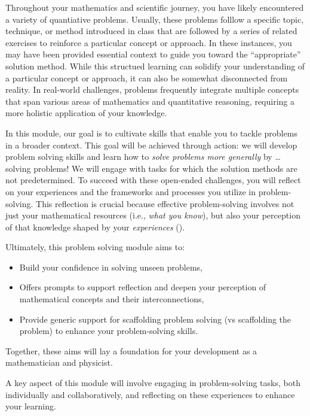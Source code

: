 \documentclass[
  a4paper,
  DIV=11,
  numbers=noendperiod,
  oneside]{scrreprt}
\providecommand{\tightlist}{%
  \setlength{\itemsep}{0pt}\setlength{\parskip}{0pt}}
\begin{document}
Throughout your mathematics and scientific journey, you have likely
encountered a variety of quantiative problems. Usually, these problems
folllow a specific topic, technique, or method introduced in class that
are followed by a series of related exercises to reinforce a particular
concept or approach. In these instances, you may have been provided
essential context to guide you toward the ``appropriate'' solution
method. While this structued learning can solidify your understanding of
a particular concept or approach, it can also be somewhat disconnected
from reality. In real-world challenges, problems frequently integrate
multiple concepts that span various areas of mathematics and
quantitative reasoning, requiring a more holistic application of your
knowledge.

In this module, our goal is to cultivate skills that enable you to
tackle problems in a broader context. This goal will be achieved through
action: we will develop problem solving skills and learn how to
\emph{solve problems more generally} by \ldots{} solving problems! We
will engage with tasks for which the solution methods are not
predetermined. To succeed with these open-ended challenges, you will
reflect on your experiences and the frameworks and processes you utilize
in problem-solving. This reflection is crucial because effective
problem-solving involves not just your mathematical resources (i.e.,
\emph{what you know}), but also your perception of that knowledge shaped
by your \emph{experiences} ().

Ultimately, this problem solving module aims to:

\begin{itemize}
\tightlist
\item
  Build your confidence in solving unseen problems,
\item
  Offers prompts to support reflection and deepen your perception of
  mathematical concepts and their interconnections,
\item
  Provide generic support for scaffolding problem solving (vs
  scaffolding the problem) to enhance your problem-solving skills.
\end{itemize}

Together, these aims will lay a foundation for your development as a
mathematician and physicist.

\begin{tcolorbox}[enhanced jigsaw, opacitybacktitle=0.6, colframe=quarto-callout-note-color-frame, bottomrule=.15mm, coltitle=black, colback=white, title=\textcolor{quarto-callout-note-color}{\faInfo}\hspace{0.5em}{TL;DR}, breakable, toptitle=1mm, arc=.35mm, left=2mm, opacityback=0, rightrule=.15mm, bottomtitle=1mm, colbacktitle=quarto-callout-note-color!10!white, toprule=.15mm, leftrule=.75mm, titlerule=0mm]

A key aspect of this module will involve engaging in problem-solving
tasks, both individually and collaboratively, and reflecting on these
experiences to enhance your learning.

\end{tcolorbox}
\end{document}
